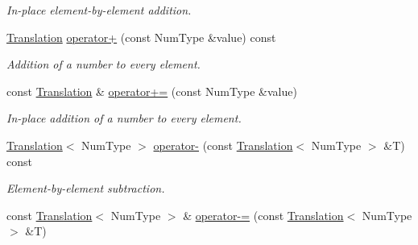 \begin{DoxyCompactItemize}
\begin{DoxyCompactList}\small\item\em In-\/place element-\/by-\/element addition. \end{DoxyCompactList}\item 
\hypertarget{singletonscrews_1_1_translation_a90e10ad5501cf7758ad03284ba57b73d}{\hyperlink{singletonscrews_1_1_translation}{Translation} \hyperlink{singletonscrews_1_1_translation_a90e10ad5501cf7758ad03284ba57b73d}{operator+} (const Num\+Type \&value) const }\label{singletonscrews_1_1_translation_a90e10ad5501cf7758ad03284ba57b73d}

\begin{DoxyCompactList}\small\item\em Addition of a number to every element. \end{DoxyCompactList}\item 
\hypertarget{singletonscrews_1_1_translation_ab082688b7d88d10f0a9aa5a2e4c536b0}{const \hyperlink{singletonscrews_1_1_translation}{Translation} \& \hyperlink{singletonscrews_1_1_translation_ab082688b7d88d10f0a9aa5a2e4c536b0}{operator+=} (const Num\+Type \&value)}\label{singletonscrews_1_1_translation_ab082688b7d88d10f0a9aa5a2e4c536b0}

\begin{DoxyCompactList}\small\item\em In-\/place addition of a number to every element. \end{DoxyCompactList}\item 
\hypertarget{singletonscrews_1_1_translation_a70813254104ccac7fa1c6275d8168cd8}{\hyperlink{singletonscrews_1_1_translation}{Translation}$<$ Num\+Type $>$ \hyperlink{singletonscrews_1_1_translation_a70813254104ccac7fa1c6275d8168cd8}{operator-\/} (const \hyperlink{singletonscrews_1_1_translation}{Translation}$<$ Num\+Type $>$ \&T) const }\label{singletonscrews_1_1_translation_a70813254104ccac7fa1c6275d8168cd8}

\begin{DoxyCompactList}\small\item\em Element-\/by-\/element subtraction. \end{DoxyCompactList}\item 
\hypertarget{singletonscrews_1_1_translation_a23d49ac1b7bab00cb66218d5edb01b8b}{const \hyperlink{singletonscrews_1_1_translation}{Translation}$<$ Num\+Type $>$ \& \hyperlink{singletonscrews_1_1_translation_a23d49ac1b7bab00cb66218d5edb01b8b}{operator-\/=} (const \hyperlink{singletonscrews_1_1_translation}{Translation}$<$ Num\+Type $>$ \&T)}\label{singletonscrews_1_1_translation_a23d49ac1b7bab00cb66218d5edb01b8b}


\end{DoxyCompactItemize}
